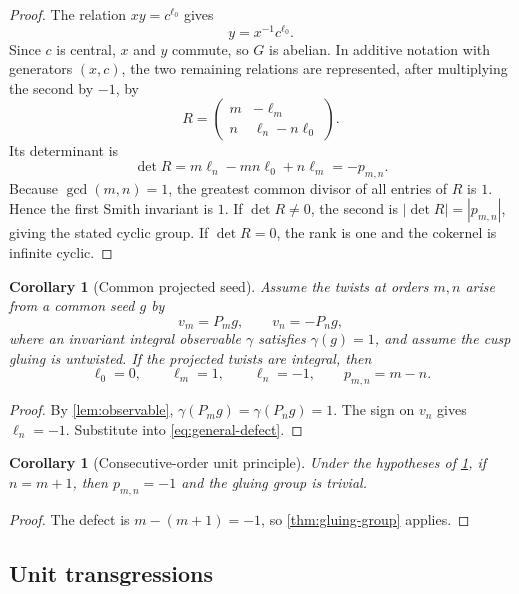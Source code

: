 \documentclass[11pt,reqno]{amsart}
\numberwithin{equation}{section}
\newtheorem{corollary}[theorem]{Corollary}
\theoremstyle{definition}
\begin{document}
\begin{proof}
The relation $xy=c^{\ell_0}$ gives
\[
y=x^{-1}c^{\ell_0}.
\]
Since $c$ is central, $x$ and $y$ commute, so $G$ is abelian. In additive notation with generators $(x,c)$, the two remaining relations are represented, after multiplying the second by $-1$, by
\[
R=
\begin{pmatrix}
m&-\ell_m\\
n&\ell_n-n\ell_0
\end{pmatrix}.
\]
Its determinant is
\[
\det R=m\ell_n-mn\ell_0+n\ell_m=-p_{m,n}.
\]
Because $\gcd(m,n)=1$, the greatest common divisor of all entries of $R$ is $1$. Hence the first Smith invariant is $1$. If $\det R\ne0$, the second is $|\det R|=|p_{m,n}|$, giving the stated cyclic group. If $\det R=0$, the rank is one and the cokernel is infinite cyclic.
\end{proof}

\begin{corollary}[Common projected seed]\label{cor:projected-defect}
Assume the twists at orders $m,n$ arise from a common seed $g$ by
\[
v_m=P_mg,
\qquad
v_n=-P_ng,
\]
where an invariant integral observable $\gamma$ satisfies $\gamma(g)=1$, and assume the cusp gluing is untwisted. If the projected twists are integral, then
\[
\ell_0=0,
\qquad
\ell_m=1,
\qquad
\ell_n=-1,
\qquad
p_{m,n}=m-n.
\]
\end{corollary}

\begin{proof}
By \cref{lem:observable}, $\gamma(P_mg)=\gamma(P_ng)=1$. The sign on $v_n$ gives $\ell_n=-1$. Substitute into \cref{eq:general-defect}.
\end{proof}

\begin{corollary}[Consecutive-order unit principle]\label{cor:consecutive}
Under the hypotheses of \cref{cor:projected-defect}, if $n=m+1$, then $p_{m,n}=-1$ and the gluing group is trivial.
\end{corollary}

\begin{proof}
The defect is $m-(m+1)=-1$, so \cref{thm:gluing-group} applies.
\end{proof}

\subsection{Unit transgressions}
\end{document}
